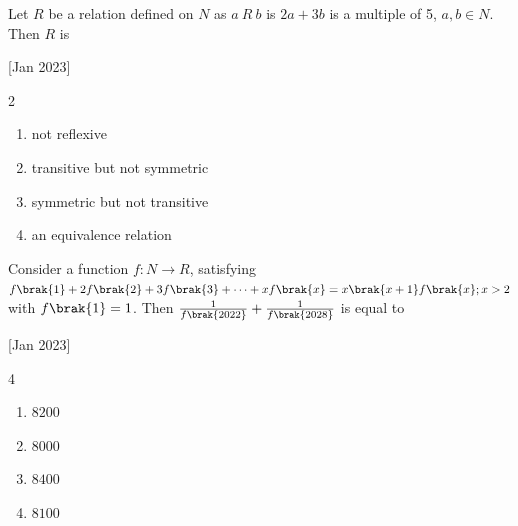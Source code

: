     \item Let $R$ be a relation defined on $N$ as $a\ R\ b$ is $2a+3b$ is a multiple of 5, $a,b\in N$. Then $R$ is
    
    \hfill{[Jan 2023]}

		\begin{multicols}{2}
			\begin{enumerate}
				\item not reflexive
				\item transitive but not symmetric
				\item symmetric but not transitive
				\item an equivalence relation
			\end{enumerate}
		\end{multicols}

    \item Consider a function $f:N\to R$, satisfying $f\brak{1}+2f\brak{2}+3f\brak{3}+\cdots+xf\brak{x}=x\brak{x+1}f\brak{x};x>2$ with $f\brak{1}=1$. Then $\frac{1}{f\brak{2022}}+\frac{1}{f\brak{2028}}$ is equal to 
    
    \hfill{[Jan 2023]}

		\begin{multicols}{4}
			\begin{enumerate}
				\item $8200$
				\item $8000$
				\item $8400$
				\item $8100$
			\end{enumerate}
		\end{multicols}
  

